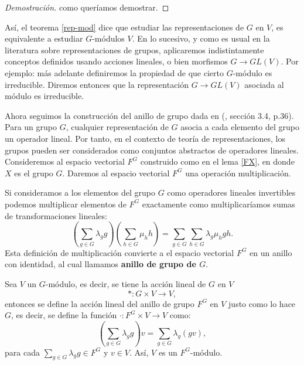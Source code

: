 \documentclass[12pt]{book}
\theoremstyle{definition}
\newtheorem{definition}[theorem]{Definición}
\newcounter{in}
\newcounter{ini}
\begin{document}
\begin{proof}[Demostración]
  como queríamos demostrar.
\end{proof}


Así, el teorema \ref{rep-mod} dice que estudiar las representaciones de $G$
en $V$, es equivalente a estudiar $G$-módulos $V$. En lo sucesivo, y
como es usual en la literatura sobre representaciones de grupos,
aplicaremos indistintamente conceptos definidos usando acciones
lineales, o bien morfismos $G\to GL(V)$. Por ejemplo: más adelante
definiremos la propiedad de que cierto $G$-módulo es irreducible. Diremos entonces que
la representación $G\to GL(V)$ asociada al módulo es irreducible.

Ahora seguimos la construcción del anillo de grupo dada en
(\cite{fulton1991representation}, sección 3.4, p.36). Para un grupo $G$, cualquier representación de $G$ asocia a cada
elemento del grupo un operador lineal. Por tanto, en el contexto de
teoría de representaciones, los grupos pueden ser considerados como
conjuntos abstractos de operadores lineales. Consideremos al espacio
vectorial $F^{G}$ construido como en el lema \ref{FX}, en donde $X$ es el grupo
$G$. Daremos al espacio vectorial $F^{G}$ una operación multiplicación.

Si consideramos a los elementos del grupo $G$ como operadores lineales invertibles podemos multiplicar
elementos de $F^{G}$ exactamente como multiplicaríamos sumas de
transformaciones lineales:
\begin{equation*}
\label{mult-alg-grupo}
  (\sum_{g\in G}\lambda_{g}g)(\sum_{h\in G}\mu_{h}h)=\sum_{g\in
    G}\sum_{h \in G}\lambda_{g}\mu_{h}gh.
\end{equation*}
Esta definición de multiplicación convierte a el espacio vectorial
$F^{G}$ en un anillo con identidad, al cual llamamos
\textbf{anillo de grupo de $G$}.

Sea $V$ un $G$-módulo, es decir, se tiene la acción lineal de $G$ en $V$ 
$$*:G\times V\rightarrow V,$$ 
entonces se define la acción lineal del anillo de grupo $F^{G}$ en $V$ justo
como lo hace~$G$, es decir, se define la función $\cdot:F^{G}\times
V\rightarrow V$ como: 
\begin{equation*}
  (\sum_{g\in G}\lambda_{g}g)v=\sum_{g\in G}\lambda_{g}(gv),
\end{equation*}
para cada $\sum_{g\in G}\lambda_{g}g\in F^{G}$ y $v\in V$. Así, $V$ es un
$F^{G}$-módulo.
\end{document}
